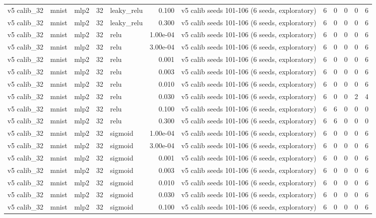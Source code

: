 \begin{table}[htbp]
{\begin{tabular}{@{}lllrlrlrrrrr@{}}
v5 calib\_32 & mnist & mlp2 & 32 & leaky\_relu & 0.100 & v5 calib seeds 101-106 (6 seeds, exploratory) & 6 & 0 & 0 & 0 & 6 \\
v5 calib\_32 & mnist & mlp2 & 32 & leaky\_relu & 0.300 & v5 calib seeds 101-106 (6 seeds, exploratory) & 6 & 0 & 0 & 0 & 6 \\
v5 calib\_32 & mnist & mlp2 & 32 & relu & 1.00e-04 & v5 calib seeds 101-106 (6 seeds, exploratory) & 6 & 0 & 0 & 0 & 6 \\
v5 calib\_32 & mnist & mlp2 & 32 & relu & 3.00e-04 & v5 calib seeds 101-106 (6 seeds, exploratory) & 6 & 0 & 0 & 0 & 6 \\
v5 calib\_32 & mnist & mlp2 & 32 & relu & 0.001 & v5 calib seeds 101-106 (6 seeds, exploratory) & 6 & 0 & 0 & 0 & 6 \\
v5 calib\_32 & mnist & mlp2 & 32 & relu & 0.003 & v5 calib seeds 101-106 (6 seeds, exploratory) & 6 & 0 & 0 & 0 & 6 \\
v5 calib\_32 & mnist & mlp2 & 32 & relu & 0.010 & v5 calib seeds 101-106 (6 seeds, exploratory) & 6 & 0 & 0 & 0 & 6 \\
v5 calib\_32 & mnist & mlp2 & 32 & relu & 0.030 & v5 calib seeds 101-106 (6 seeds, exploratory) & 6 & 0 & 0 & 2 & 4 \\
v5 calib\_32 & mnist & mlp2 & 32 & relu & 0.100 & v5 calib seeds 101-106 (6 seeds, exploratory) & 6 & 6 & 0 & 0 & 0 \\
v5 calib\_32 & mnist & mlp2 & 32 & relu & 0.300 & v5 calib seeds 101-106 (6 seeds, exploratory) & 6 & 6 & 0 & 0 & 0 \\
v5 calib\_32 & mnist & mlp2 & 32 & sigmoid & 1.00e-04 & v5 calib seeds 101-106 (6 seeds, exploratory) & 6 & 0 & 0 & 0 & 6 \\
v5 calib\_32 & mnist & mlp2 & 32 & sigmoid & 3.00e-04 & v5 calib seeds 101-106 (6 seeds, exploratory) & 6 & 0 & 0 & 0 & 6 \\
v5 calib\_32 & mnist & mlp2 & 32 & sigmoid & 0.001 & v5 calib seeds 101-106 (6 seeds, exploratory) & 6 & 0 & 0 & 0 & 6 \\
v5 calib\_32 & mnist & mlp2 & 32 & sigmoid & 0.003 & v5 calib seeds 101-106 (6 seeds, exploratory) & 6 & 0 & 0 & 0 & 6 \\
v5 calib\_32 & mnist & mlp2 & 32 & sigmoid & 0.010 & v5 calib seeds 101-106 (6 seeds, exploratory) & 6 & 0 & 0 & 0 & 6 \\
v5 calib\_32 & mnist & mlp2 & 32 & sigmoid & 0.030 & v5 calib seeds 101-106 (6 seeds, exploratory) & 6 & 0 & 0 & 0 & 6 \\
v5 calib\_32 & mnist & mlp2 & 32 & sigmoid & 0.100 & v5 calib seeds 101-106 (6 seeds, exploratory) & 6 & 0 & 0 & 0 & 6 \\

\end{tabular}}
\end{table}

